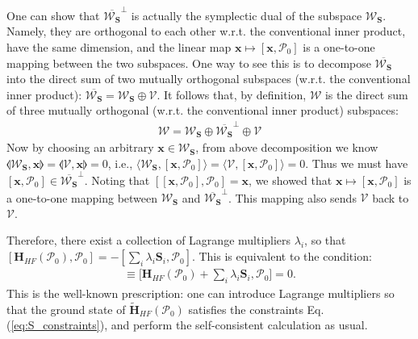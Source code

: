 \begin{subappendices}
One can show that $\overline{\boldsymbol{\mathcal W}_{\mathbf S}}^\perp$ is actually the symplectic dual of the subspace $\boldsymbol{\mathcal W}_{\mathbf S}$. Namely, they are orthogonal to each other w.r.t. the conventional inner product, have the same dimension, and the linear map $\mathbf x\mapsto [\mathbf x,\boldsymbol{\mathcal P}_0]$ is a one-to-one mapping between the two subspaces. One way to see this is to decompose $\overline{\boldsymbol{\mathcal W}_{\mathbf S}}$ into the direct sum of two mutually orthogonal subspaces (w.r.t. the conventional inner product): $\overline{\boldsymbol{\mathcal W}_{\mathbf S}}=\boldsymbol{\mathcal W}_{\mathbf S}\oplus \boldsymbol{\mathcal V}$. It follows that, by definition, $\boldsymbol{\mathcal W}$ is the direct sum of three mutually orthogonal (w.r.t. the conventional inner product) subspaces:
\begin{align}
\boldsymbol{\mathcal W}=\boldsymbol{\mathcal W}_{\mathbf S}\oplus\overline{\boldsymbol{\mathcal W}_{\mathbf S}}^\perp\oplus\boldsymbol{\mathcal V}\label{eq:W_decomposition}
\end{align}
Now by choosing an arbitrary $\mathbf x\in \boldsymbol{\mathcal W}_{\mathbf S}$, from above decomposition we know $\llangle \boldsymbol{\mathcal W}_{\mathbf S},\mathbf x\rrangle=\llangle \boldsymbol{\mathcal V},\mathbf x\rrangle=0$, i.e., $\langle \boldsymbol{\mathcal W}_{\mathbf S},[\mathbf x,\boldsymbol{\mathcal P}_0]\rangle=\langle \boldsymbol{\mathcal V},[\mathbf x,\boldsymbol{\mathcal P}_0]\rangle=0$. Thus we must have $[\mathbf x,\boldsymbol{\mathcal P}_0]\in \overline{\boldsymbol{\mathcal W}_{\mathbf S}}^\perp$. Noting that $[[\mathbf x,\boldsymbol{\mathcal P}_0],\boldsymbol{\mathcal P}_0]=\mathbf x$, we showed that $\mathbf x\mapsto [\mathbf x,\boldsymbol{\mathcal P}_0]$ is a one-to-one mapping between $\boldsymbol{\mathcal W}_{\mathbf S}$ and $\overline{\boldsymbol{\mathcal W}_{\mathbf S}}^\perp$. This mapping also sends $\boldsymbol{\mathcal V}$ back to $\boldsymbol{\mathcal V}$.

Therefore, there exist a collection of Lagrange multipliers $\lambda_i$, so that $[\mathbf H_{HF}(\boldsymbol{\mathcal P}_0),\boldsymbol{\mathcal P}_0]=-[\sum_i\lambda_i\mathbf S_i,\boldsymbol{\mathcal P}_0]$. This is equivalent to the condition:
\begin{align}
[\mathbf{\tilde H}_{HF}(\boldsymbol{\mathcal P}_0), \boldsymbol{\mathcal P}_0]\equiv\bigg[\mathbf H_{HF}(\boldsymbol{\mathcal P}_0)+\sum_i\lambda_i\mathbf S_i, \boldsymbol{\mathcal P}_0\bigg]=0.
\end{align}
This is the well-known prescription: one can introduce Lagrange multipliers so that the ground state of $\mathbf{\tilde H}_{HF}(\boldsymbol{\mathcal P}_0)$ satisfies the constraints Eq.(\ref{eq:S_constraints}), and perform the self-consistent calculation as usual. 


\end{subappendices}
